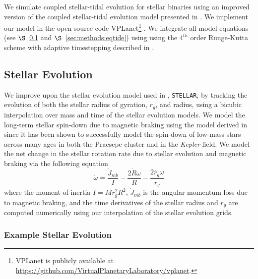\documentclass[twocolumn]{aastex61}
\newcommand{\stellar}[0]{\texttt{STELLAR}\xspace}
\newcommand{\kepler}[0]{\textit{Kepler}\xspace}
\begin{document}
We simulate coupled stellar-tidal evolution for stellar binaries using an improved version of the coupled stellar-tidal evolution model presented in \citet{Fleming2018}.  We implement our model in the open-source code VPLanet\footnote{VPLanet is publicly available
at \href{https://github.com/VirtualPlanetaryLaboratory/vplanet}{{https://github.com/VirtualPlanetaryLaboratory/vplanet}}.} \citep[][Barnes et al., in prep]{Barnes2016,vplanet2018}.  We integrate all model equations (see $\S$~\ref{sec:methods:stellar} and $\S$~\ref{sec:methods:eqtide}) using using the $4^{th}$ order Runge-Kutta scheme with adaptive timestepping described in \citet{Fleming2018}.  

\subsection{Stellar Evolution} \label{sec:methods:stellar}

We improve upon the stellar evolution model used in \citet{Fleming2018}, \stellar, by tracking the evolution of both the stellar radius of gyration, $r_g$, and radius, using a bicubic interpolation over mass and time of the \citet{Baraffe2015} stellar evolution models. We model the long-term stellar spin-down due to magnetic braking using the model derived in \citet{Matt2015} since it has been shown to successfully model the spin-down of low-mass stars across many ages in both the Praesepe cluster and in the \kepler field. We model the net change in the stellar rotation rate due to stellar evolution and magnetic braking via the following equation 
\begin{equation} \label{eqn:stellar_rot_rate_dt}
\dot{\omega} = \frac{\dot{J}_{mb}}{I} - \frac{2 \dot{R} \omega}{R} - \frac{2 \dot{r_g} \omega}{r_g}
\end{equation}
where the moment of inertia $I = M r_g^2 R^2$, $\dot{J}_{mb}$ is the angular momentum loss due to magnetic braking, and the time derivatives of the stellar radius and $r_g$ are computed numerically using our interpolation of the \citet{Baraffe2015} stellar evolution grids.  

\subsubsection{Example Stellar Evolution} \label{sec:methods:stellarExample}
\end{document}
